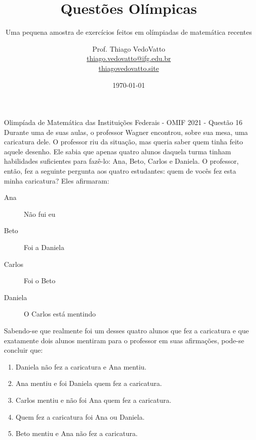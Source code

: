 \documentclass[10pt,aspectratio=169]{beamer}
\begin{document}
\title{Questões Olímpicas}
\subtitle{Uma pequena amostra de exercícios feitos em olímpiadas de matemática recentes}
\date{\today}
\author[Thiago VedoVatto]{Prof. Thiago VedoVatto\\\scriptsize{
		\href{mailto:thiago.vedovatto@ifg.edu.br}{thiago.vedovatto@ifg.edu.br}\\
		\url{thiagovedovatto.site}	
}}


\begin{frame}[t]
	\small
	\begin{exercicio}{Olimpíada de Matemática das Instituições Federais - OMIF 2021 - Questão 16} Durante uma de suas aulas, o professor Wagner encontrou, sobre sua mesa, uma caricatura dele.
	O professor riu da situação, mas queria saber quem tinha feito aquele desenho.
	Ele sabia que apenas quatro alunos daquela turma tinham habilidades suficientes para fazê-lo: Ana, Beto, Carlos e Daniela.
	O professor, então, fez a seguinte pergunta aos quatro estudantes: quem de vocês fez esta minha caricatura? Eles afirmaram:
	\begin{description}
		\item[Ana] Não fui eu
		\item[Beto] Foi a Daniela
		\item[Carlos] Foi o Beto
		\item[Daniela] O Carlos está mentindo
	\end{description}
	Sabendo-se que realmente foi um desses quatro alunos que fez a caricatura e que exatamente dois alunos mentiram para o professor em suas afirmações, pode-se concluir que:
	\begin{enumerate}[a]
		\item Daniela não fez a caricatura e Ana mentiu.
		\item Ana mentiu e foi Daniela quem fez a caricatura.
		\item Carlos mentiu e não foi Ana quem fez a caricatura.
		\item Quem fez a caricatura foi Ana ou Daniela.
		\item Beto mentiu e Ana não fez a caricatura.
	\end{enumerate}
	\end{exercicio}
\end{frame}
\end{document}
